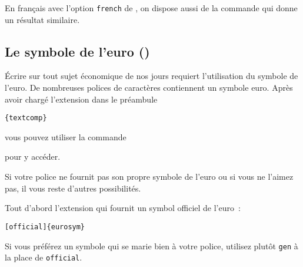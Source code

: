 En français avec l'option \texttt{french} de , on dispose aussi
de la commande  qui donne un résultat similaire.

\subsection{Le symbole de l'euro \texorpdfstring{(\officialeuro)}{}}

Écrire sur tout sujet économique de nos jours requiert l'utilisation
du symbole de l'euro. De nombreuses polices de caractères contiennent
un symbole euro. Après avoir chargé l'extension  dans le
préambule
\begin{lscommand}
\verb|{textcomp}|
\end{lscommand}
\noindent vous pouvez utiliser la commande
\begin{lscommand}
\end{lscommand}
\noindent pour y accéder.

Si votre police ne fournit pas son propre symbole de l'euro ou si vous
ne l'aimez pas, il vous reste d'autres possibilités.

Tout d'abord l'extension  qui fournit un symbol officiel
de l'euro~:
\begin{lscommand}
\verb|[official]{eurosym}|
\end{lscommand}
Si vous préférez un symbole qui se marie bien à votre police, utilisez
plutôt \texttt{gen} à la place de \texttt{official}.



